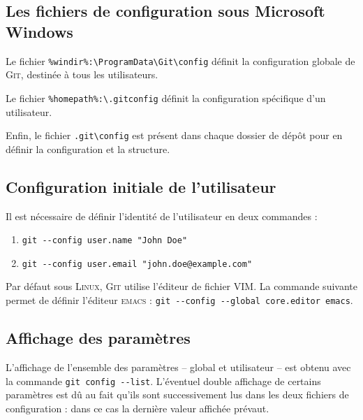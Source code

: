 \documentclass[11pt,twoside,headings=normal,open=right,french,DIV=12]{scrreprt}
\newcommand{\git}{\textsc{Git}}
\newcommand{\spec}[1]{\texttt{#1}}
\begin{document}
\subsection{Les fichiers de configuration sous Microsoft Windows}



    Le fichier \spec{\%windir\%:\textbackslash{}ProgramData\textbackslash{}Git\textbackslash{}config} définit la configuration
    globale de \git, destinée à tous les utilisateurs.
    
    Le fichier \spec{\%homepath\%:\textbackslash.gitconfig} définit la configuration spécifique d'un utilisateur.
    
    Enfin, le fichier \spec{.git\textbackslash config} est présent dans chaque dossier de dépôt pour en définir la configuration
    et la structure.    



\subsection{Configuration initiale de l'utilisateur}


    Il est nécessaire de définir l'identité de l'utilisateur en deux commandes :
    \begin{enumerate}
        \item \verb|git --config user.name "John Doe"|
        \item \verb|git --config user.email "john.doe@example.com"|
    \end{enumerate}

    Par défaut sous \textsc{Linux}, \git{} utilise l'éditeur de fichier \textsc{VIM}. La commande suivante permet de
    définir l'éditeur \textsc{emacs} : \verb|git --config --global core.editor emacs|.



\subsection{Affichage des paramètres}

    
    
    L'affichage de l'ensemble des paramètres -- global et utilisateur -- est obtenu avec la commande
    \verb|git config --list|. L'éventuel double affichage de certains paramètres est dû au fait qu'ils sont successivement
    lus dans les deux fichiers de configuration : dans ce cas la dernière valeur affichée prévaut.

    \smallskip
    
\end{document}
